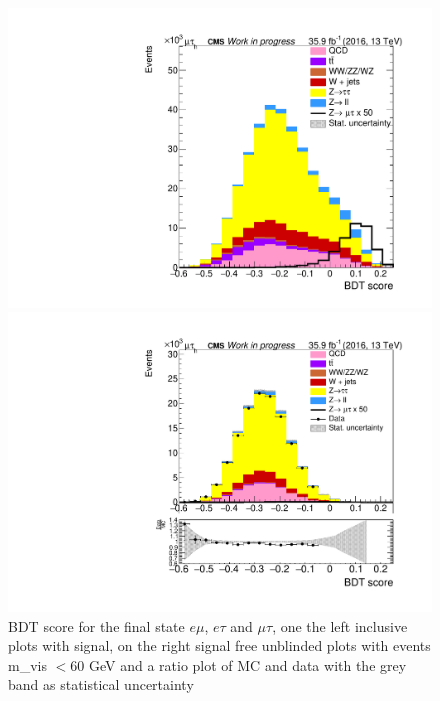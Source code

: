 \begin{figure}[htp]
	\begin{multicols}{2}
		\includegraphics[width=\linewidth]{plots/mt/BDTScore.pdf}\par 
		\includegraphics[width=\linewidth]{plots/mt/BDTScore_ZTTCR}\par
	\end{multicols}		

	\caption[BDT score]{\gls{BDT} score for the final state $e\mu$, $e\tau$ and $\mu\tau$, one the left inclusive plots with signal, on the right signal free unblinded plots with events \gls{m_vis} $< 60$ GeV and a ratio plot of \gls{MC} and data with the grey band as statistical uncertainty}
	\label{fig:fig_3_11}
\end{figure}

